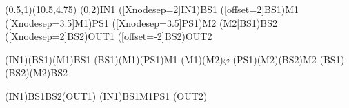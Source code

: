 \documentclass[pstricks]{standalone}
\begin{document}
	\begin{pspicture}(0.5,1)(10.5,4.75)
        \pnode(0,2){IN1}
        \pnode([Xnodesep=2]IN1){BS1}
        \pnode([offset=2]BS1){M1}
        \pnode([Xnodesep=3.5]M1){PS1}
        \pnode([Xnodesep=3.5]PS1){M2}
        \pnode(M2|BS1){BS2}
        \pnode([Xnodesep=2]BS2){OUT1}
        \pnode([offset=-2]BS2){OUT2}
        \begin{optexp}
            \beamsplitter[compname=BS1, labelangle=-45, labeloffset=1](IN1)(BS1)(M1){BS1}
            \mirror[compname=M1, labeloffset=0.6](BS1)(M1)(PS1){M1}
            \optbox[compname=PS1, innerlabel, optboxsize=1.0 0.8](M1)(M2){$\varphi$}
            \mirror[compname=M2, labeloffset=0.6](PS1)(M2)(BS2){M2}
            \beamsplitter[compname=BS2, labelangle=-45, labeloffset=1](BS1)(BS2)(M2){BS2}

			\drawbeam(IN1){BS1}{BS2}(OUT1)
			\drawbeam(IN1){BS1}{M1}{PS1}
			(OUT2)
        \end{optexp}
    \end{pspicture}
\end{document}
